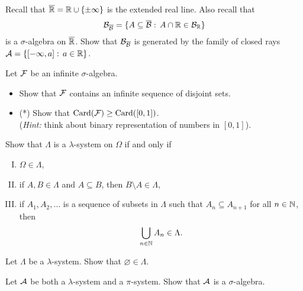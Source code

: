 \begin{problem}
    Recall that $\overline{\mathbb R} = \mathbb R\cup\{\pm\infty\}$ is the extended real line. Also recall that 
    \begin{equation*}
        \mathcal B_{\overline{\mathcal B}} = \{A\subseteq \overline{\mathcal B}:\, A\cap \mathbb R \in \mathcal B_{\mathbb R}\}
    \end{equation*}
    is a $\sigma$-algebra on $\overline{\mathbb R}$. Show that $\mathcal B_{\overline{\mathcal B}}$ is generated by the family of closed rays $\mathcal A= \{[-\infty,a]:\,a\in \mathbb R\}$.
\end{problem}

\begin{problem}
    Let $\mathcal F$ be an infinite $\sigma$-algebra. 
    \begin{itemize}
        \item Show that $\mathcal F$ contains an infinite sequence of disjoint sets.
        \item (*) Show that $\mathrm{Card}(\mathcal F)\geq \mathrm{Card}([0,1])$. \\(\emph{Hint:} think about binary representation of numbers in $[0,1]$).
    \end{itemize}
\end{problem}

\begin{problem}
    Show that $\Lambda$ is a $\lambda$-system on $\Omega$ if and only if
    \begin{enumerate}[I.]
        \item $\Omega\in \Lambda$,
        \item if $A,B\in \Lambda$ and $A\subseteq B$, then $B\setminus A\in \Lambda$,
        \item if $A_1,A_2,\ldots$ is a sequence of subsets in $\Lambda$ such that $A_n \subseteq A_{n+1}$ for all $n\in \mathbb N$, then
        \begin{equation*}
            \bigcup_{n\in \mathbb N} A_n \in \Lambda.
        \end{equation*}
    \end{enumerate}
\end{problem}


\begin{problem}
    Let $\Lambda$ be a $\lambda$-system. Show that $\varnothing\in \Lambda$.
\end{problem}

\begin{problem}
    Let $\mathcal A$ be both a $\lambda$-system and a $\pi$-system. Show that $\mathcal A$ is a $\sigma$-algebra.
\end{problem}